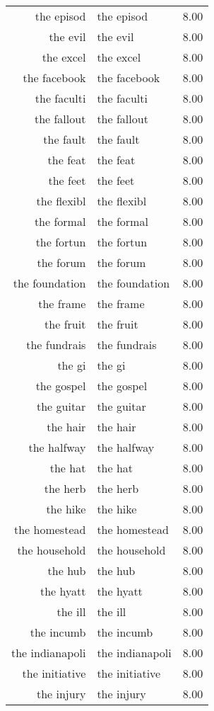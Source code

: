 \begin{table}[ht]
\begin{tabular}{rlr}
  the episod & the episod & 8.00 \\ 
  the evil & the evil & 8.00 \\ 
  the excel & the excel & 8.00 \\ 
  the facebook & the facebook & 8.00 \\ 
  the faculti & the faculti & 8.00 \\ 
  the fallout & the fallout & 8.00 \\ 
  the fault & the fault & 8.00 \\ 
  the feat & the feat & 8.00 \\ 
  the feet & the feet & 8.00 \\ 
  the flexibl & the flexibl & 8.00 \\ 
  the formal & the formal & 8.00 \\ 
  the fortun & the fortun & 8.00 \\ 
  the forum & the forum & 8.00 \\ 
  the foundation & the foundation & 8.00 \\ 
  the frame & the frame & 8.00 \\ 
  the fruit & the fruit & 8.00 \\ 
  the fundrais & the fundrais & 8.00 \\ 
  the gi & the gi & 8.00 \\ 
  the gospel & the gospel & 8.00 \\ 
  the guitar & the guitar & 8.00 \\ 
  the hair & the hair & 8.00 \\ 
  the halfway & the halfway & 8.00 \\ 
  the hat & the hat & 8.00 \\ 
  the herb & the herb & 8.00 \\ 
  the hike & the hike & 8.00 \\ 
  the homestead & the homestead & 8.00 \\ 
  the household & the household & 8.00 \\ 
  the hub & the hub & 8.00 \\ 
  the hyatt & the hyatt & 8.00 \\ 
  the ill & the ill & 8.00 \\ 
  the incumb & the incumb & 8.00 \\ 
  the indianapoli & the indianapoli & 8.00 \\ 
  the initiative & the initiative & 8.00 \\ 
  the injury & the injury & 8.00 \\ 

\end{tabular}
\end{table}
